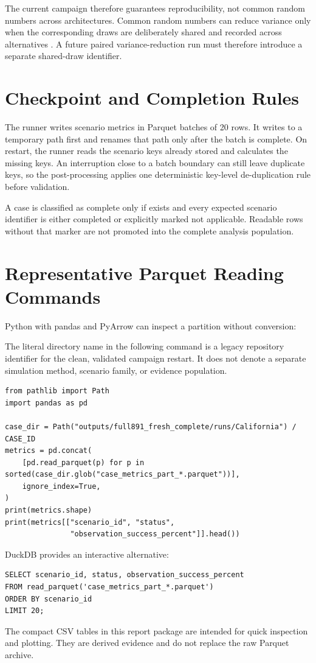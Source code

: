 The current campaign therefore guarantees reproducibility, not common random numbers across architectures. Common random numbers can reduce variance only when the corresponding draws are deliberately shared and recorded across alternatives \citep{SloanUnwin1990}. A future paired variance-reduction run must therefore introduce a separate shared-draw identifier.

\section{Checkpoint and Completion Rules}

The runner writes scenario metrics in Parquet batches of 20 rows. It writes to a temporary path first and renames that path only after the batch is complete. On restart, the runner reads the scenario keys already stored and calculates the missing keys. An interruption close to a batch boundary can still leave duplicate keys, so the post-processing applies one deterministic key-level de-duplication rule before validation.

A case is classified as complete only if  exists and every expected scenario identifier is either completed or explicitly marked not applicable. Readable rows without that marker are not promoted into the complete analysis population.

\section{Representative Parquet Reading Commands}

Python with pandas and PyArrow can inspect a partition without conversion:

The literal directory name  in the following command is a legacy repository identifier for the clean, validated campaign restart. It does not denote a separate simulation method, scenario family, or evidence population.

\begin{lstlisting}
from pathlib import Path
import pandas as pd

case_dir = Path("outputs/full891_fresh_complete/runs/California") / CASE_ID
metrics = pd.concat(
    [pd.read_parquet(p) for p in sorted(case_dir.glob("case_metrics_part_*.parquet"))],
    ignore_index=True,
)
print(metrics.shape)
print(metrics[["scenario_id", "status",
               "observation_success_percent"]].head())
\end{lstlisting}

DuckDB provides an interactive alternative:

\begin{lstlisting}
SELECT scenario_id, status, observation_success_percent
FROM read_parquet('case_metrics_part_*.parquet')
ORDER BY scenario_id
LIMIT 20;
\end{lstlisting}

The compact CSV tables in this report package are intended for quick inspection and plotting. They are derived evidence and do not replace the raw Parquet archive.
